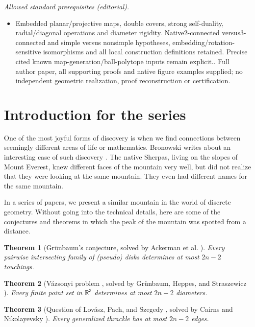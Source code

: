 \documentclass[10pt,a4paper]{article}
\newtheorem{theorem}{Theorem}[section]
\newcommand{\R}[0]{\mathbb{R}}
\begin{document}
\noindent\textit{Allowed standard prerequisites (editorial).}\begin{itemize}
\item Embedded planar/projective maps, double covers, strong self-duality, radial/diagonal operations and diameter rigidity. Native2-connected versus3-connected and simple versus nonsimple hypotheses, embedding/rotation-sensitive isomorphisms and all local construction definitions retained. Precise cited known map-generation/ball-polytope inputs remain explicit.. Full author paper, all supporting proofs and native figure examples supplied; no independent geometric realization, proof reconstruction or certification.
\end{itemize}\medskip
\section{Introduction for the series}
One of the most joyful forms of discovery is when we find connections between seemingly different areas of life or mathematics. Bronowski writes about an interesting case of such discovery \cite{bronowski1956}. The native Sherpas, living on the slopes of Mount Everest, knew different faces of the mountain very well, but did not realize that they were looking at the same mountain. They even had different names for the same mountain. 

In a series of papers, we present a similar mountain in the world of discrete geometry. Without going into the technical details, here are some of the conjectures and theorems in which the peak of the mountain was spotted from a distance. 


\begin{theorem}[Grünbaum's conjecture, solved by Ackerman et al. \cite{pseudodamasdi}]\label{thm:listgr}
    Every pairwise intersecting family of (pseudo) disks determines at most $2n-2$ touchings.
\end{theorem}


\begin{theorem}[Vázsonyi problem \cite{ERD46}, solved by Grünbaum, Heppes, and Straszewicz \cite{GRU56,HEP56, STR57}]\label{thm:listvazsony}
   Every finite point set in $\R^3$ determines at most $2n-2$ diameters.  
\end{theorem}

\begin{theorem}[Question of Lovász, Pach, and Szegedy \cite{lovasz1997conway}, solved by Cairns and Nikolayevsky \cite{CN00}]
Every generalized thrackle has at most $2n-2$ edges.    
\end{theorem}
\end{document}
